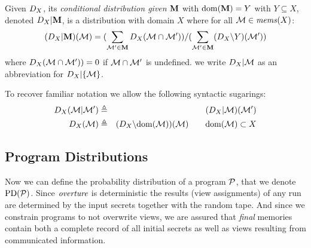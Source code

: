 \begin{definition}
  Given $D_{X}$, its \emph{conditional distribution given
  $\mathbf{M}$} with $\mathrm{dom}(\mathbf{M}) = Y$ with $Y \subseteq X$, denoted
  $D_{X}|\mathbf{M}$, is a distribution with domain $X$ where for all
  $\mathcal{M} \in \mathit{mems}(X)$:
  $$
  (D_{X}|\mathbf{M})(\mathcal{M}) =
  (\sum_{\mathcal{M}' \in \mathbf{M}} D_{X}(\mathcal{M} \cap \mathcal{M}')) /
  (\sum_{\mathcal{M}' \in \mathbf{M}} (D_{X}\backslash Y)(\mathcal{M}'))
  $$
  where $D_{X}(\mathcal{M} \cap \mathcal{M}')) = 0$ if $\mathcal{M} \cap \mathcal{M}'$ is undefined.
  we write $D_{X}|\mathcal{M}$ as an abbreviation for $D_{X}|\{ \mathcal{M} \}$.
\end{definition}
To recover familiar notation we allow the following syntactic
sugarings:
\begin{eqnarray*}
D_{X}(\mathcal{M}|\mathcal{M}') &\triangleq& (D_{X}|\mathcal{M})(\mathcal{M}')\\
D_{X}(\mathcal{M}) &\triangleq& (D_{X}\backslash\mathrm{dom}(\mathcal{M}))(\mathcal{M}) \qquad \mathrm{dom}(\mathcal{M}) \subset X
\end{eqnarray*}

\subsection{Program Distributions}
Now we can define the probability distribution of a program $\mathcal{P}$,
that we denote $\mathrm{PD}(\mathcal{P})$. Since $\mathit{overture}$ is deterministic the
results (view assignments) of any run are determined by the input
secrets together with the random tape. And since we constrain programs
to not overwrite views, we are assured that \emph{final} memories
contain both a complete record of all initial secrets as well as views
resulting from communicated information.

